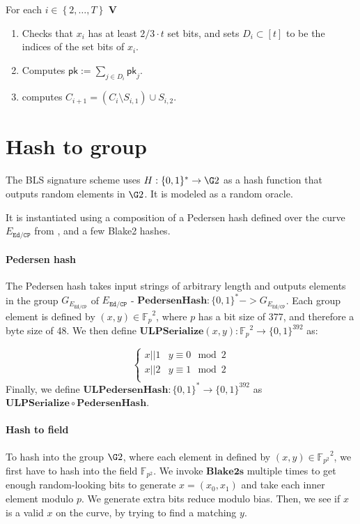 \documentclass[11pt]{article}
\numberwithin{figure}{section} %
\newcommand{\set}[1]{\ensuremath{\left\{#1\right\}}\xspace}
\newcommand{\Fp}{\ensuremath{\mathbb{F}_p}\xspace}
\newcommand{\Fptwo}{\ensuremath{\mathbb{F}_{p^2}}\xspace}
\newcommand{\defeq}{:=}
\newcommand{\msg}{\ensuremath{\mathsf{m}}\xspace}
\newcommand{\pk}{\ensuremath{\mathsf{pk}}\xspace}
\newcommand{\phash}{\ensuremath{\mathbf{PedersenHash}}\xspace}
\newcommand{\ulphash}{\ensuremath{\mathbf{ULPedersenHash}}\xspace}
\newcommand{\bhash}{\ensuremath{\mathbf{Blake2s}}\xspace}
\newcommand{\ulpserialize}{\ensuremath{\mathbf{ULPSerialize}}\xspace}
\newcommand{\ver}{\ensuremath{\mathsf{\mathbf{V}}}\xspace}
\newcommand{\sig}{\ensuremath{\sigma}\xspace}
\newcommand{\edcp}{\ensuremath{{E}_\mathtt{Ed/CP}}\xspace}
\newcommand{\gedcp}{\ensuremath{G_{{E}_\mathtt{Ed/CP}}}\xspace}
\begin{document}
For each $i\in \set{2,\ldots,T}$ \ver 
\begin{enumerate}
 \item Checks that $x_i$ has at least $2/3\cdot t$ set bits, and sets $D_i\subset [t]$ to be the indices of the set bits of $x_i$.
 \item Computes $\pk\defeq \sum_{j\in D_i} \pk_j$.
 \item computes $C_{i+1} = (C_{i}\setminus S_{i,1})\cup S_{i,2}$.
 
\end{enumerate}

\section{Hash to group}

The BLS signature scheme uses $H: \{0,1\}^* \rightarrow \G2$ as a hash function that outputs random elements in $\G2$. It is modeled as a random oracle.

It is instantiated using a composition of a Pedersen hash defined over the curve $\edcp$ from \cite{bowe2018zexe}, and a few Blake2 hashes. 

\paragraph{Pedersen hash}
The Pedersen hash takes input strings of arbitrary length and outputs elements in the group $\gedcp$ of $\edcp$ - $\phash: \{0,1\}^* -> \gedcp$. Each group element is defined by $(x,y) \in \Fp^2$, where $p$ has a bit size of 377, and therefore a byte size of 48. We then define $\ulpserialize(x,y): \Fp^2 \rightarrow \{0,1\}^{392}$ as:

\[ \begin{cases} 
x || 1 & y \equiv 0 \mod 2 \\
x || 2 & y \equiv 1 \mod 2 \\
\end{cases}
\]
Finally, we define $\ulphash: \{0,1\}^* \rightarrow \{0,1\}^{392}$ as $\ulpserialize \circ \phash $.

\paragraph{Hash to field}
To hash into the group $\G2$, where each element in defined by $(x,y) \in \Fptwo^2$, we first have to hash into the field $\Fptwo$. We invoke $\bhash$ multiple times to get enough random-looking bits to generate $x = (x_0, x_1)$ and take each inner element modulo $p$. We generate extra bits reduce modulo bias. Then, we see if $x$ is a valid $x$ on the curve, by trying to find a matching $y$.
\end{document}
